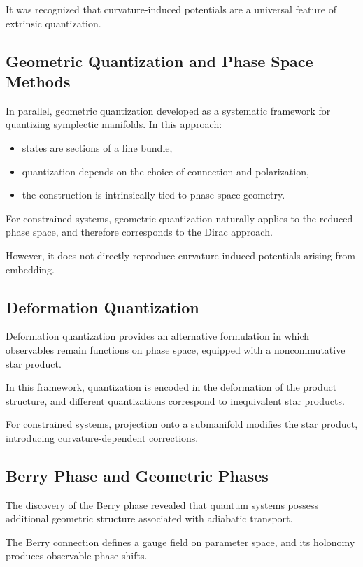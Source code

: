 \documentclass[11pt]{article}
\begin{document}
It was recognized that curvature-induced potentials are a universal feature of extrinsic quantization.

\subsection{Geometric Quantization and Phase Space Methods}

In parallel, geometric quantization developed as a systematic framework for quantizing symplectic manifolds. In this approach:

\begin{itemize}
\item states are sections of a line bundle,
\item quantization depends on the choice of connection and polarization,
\item the construction is intrinsically tied to phase space geometry.
\end{itemize}

For constrained systems, geometric quantization naturally applies to the reduced phase space, and therefore corresponds to the Dirac approach.

However, it does not directly reproduce curvature-induced potentials arising from embedding.

\subsection{Deformation Quantization}

Deformation quantization provides an alternative formulation in which observables remain functions on phase space, equipped with a noncommutative star product.

In this framework, quantization is encoded in the deformation of the product structure, and different quantizations correspond to inequivalent star products.

For constrained systems, projection onto a submanifold modifies the star product, introducing curvature-dependent corrections.

\subsection{Berry Phase and Geometric Phases}

The discovery of the Berry phase revealed that quantum systems possess additional geometric structure associated with adiabatic transport.

The Berry connection defines a gauge field on parameter space, and its holonomy produces observable phase shifts.
\end{document}
